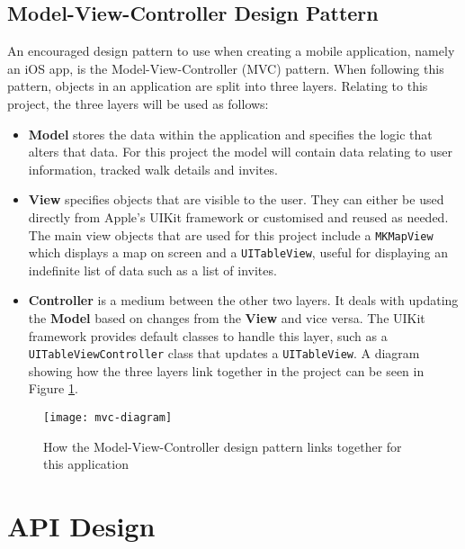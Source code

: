 
\subsection{Model-View-Controller Design Pattern}

An encouraged design pattern to use when creating a mobile application, namely an iOS app, is the Model-View-Controller (MVC) pattern. When following this pattern, objects in an application are split into three layers. Relating to this project, the three layers will be used as follows:

\begin{itemize}
  \item \textbf{Model} stores the data within the application and specifies the logic that alters that data. For this project the model will contain data relating to user information, tracked walk details and invites.
  
  \item \textbf{View} specifies objects that are visible to the user. They can either be used directly from Apple's UIKit framework or customised and reused as needed. The main view objects that are used for this project include a \texttt{MKMapView} which displays a map on screen and a \texttt{UITableView}, useful for displaying an indefinite list of data such as a list of invites.
  
  \item \textbf{Controller} is a medium between the other two layers. It deals with updating the \textbf{Model} based on changes from the \textbf{View} and vice versa. The UIKit framework provides default classes to handle this layer, such as a \texttt{UITableViewController} class that updates a \texttt{UITableView}. A diagram showing how the three layers link together in the project can be seen in Figure \ref{fig:mvc-diagram}.
\end{itemize}

\begin{figure}[hbt]
  \centering
  \texttt{[image: mvc-diagram]}
  \caption{How the Model-View-Controller design pattern links together for this application}
  \label{fig:mvc-diagram}
\end{figure}



\section{API Design}

